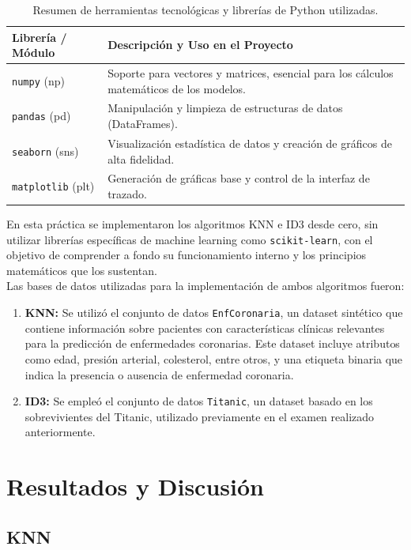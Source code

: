 \documentclass[12pt]{article}
\begin{document}
\begin{table}[H]
\renewcommand{\arraystretch}{1.5}
\centering
\begin{tabularx}{\textwidth}{|l|X|}
\hline
\rowcolor[HTML]{EFEFEF}
\textbf{Librería / Módulo} & \textbf{Descripción y Uso en el Proyecto} \\ \hline
\texttt{numpy} (np) & Soporte para vectores y matrices, esencial para los cálculos matemáticos de los modelos. \\ \hline
\texttt{pandas} (pd) & Manipulación y limpieza de estructuras de datos (DataFrames). \\ \hline
\texttt{seaborn} (sns) & Visualización estadística de datos y creación de gráficos de alta fidelidad. \\ \hline
\texttt{matplotlib} (plt) & Generación de gráficas base y control de la interfaz de trazado. \\ \hline
\end{tabularx}
\caption{Resumen de herramientas tecnológicas y librerías de Python utilizadas.}
\end{table}

En esta práctica se implementaron los algoritmos KNN e ID3 desde cero, sin utilizar librerías específicas de machine learning como \texttt{scikit-learn}, con el objetivo de comprender a fondo su funcionamiento interno y los principios matemáticos que los sustentan.
\\
Las bases de datos utilizadas para la implementación de ambos algoritmos fueron:
\begin{enumerate}
    \item \textbf{KNN:} Se utilizó el conjunto de datos \texttt{EnfCoronaria}, un dataset sintético que contiene información sobre pacientes con características clínicas relevantes para la predicción de enfermedades coronarias. Este dataset incluye atributos como edad, presión arterial, colesterol, entre otros, y una etiqueta binaria que indica la presencia o ausencia de enfermedad coronaria.
    \item \textbf{ID3:} Se empleó el conjunto de datos \texttt{Titanic}, un dataset basado en los sobrevivientes del Titanic, utilizado previamente en el examen realizado anteriormente.
\end{enumerate}

\section{Resultados y Discusión}
\subsection{KNN}
\end{document}
